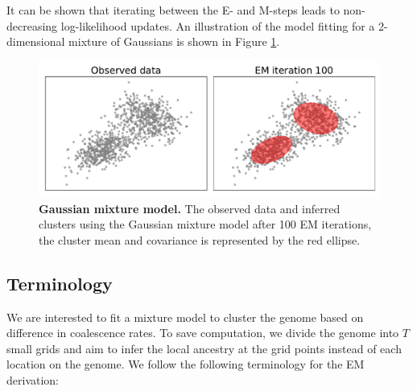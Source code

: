 It can be shown that iterating between the E- and M-steps leads to non-decreasing log-likelihood updates. An illustration of the model fitting for a 2-dimensional mixture of Gaussians is shown in Figure \ref{fig:gb-gmm-visualize}.

\begin{figure}
    \centering
    \includegraphics[width=\textwidth]{figures/gmm_visualize.pdf}
    \caption{\textbf{Gaussian mixture model.} The observed data and inferred clusters using the Gaussian mixture model after 100 EM iterations, the cluster mean and covariance is represented by the red ellipse.}
    \label{fig:gb-gmm-visualize}
\end{figure}

\subsection{Terminology}
\label{terminology}
We are interested to fit a mixture model to cluster the genome based on difference in coalescence rates. To save computation, we divide the genome into $T$ small grids and aim to infer the local ancestry at the grid points instead of each location on the genome. We follow the following terminology for the EM derivation:

